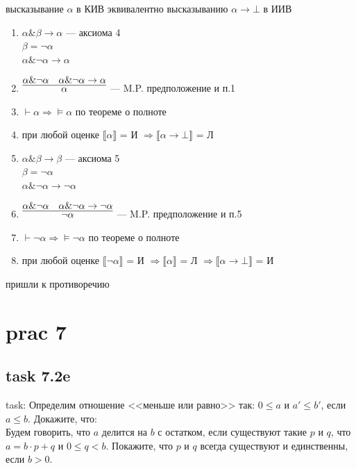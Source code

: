 \documentclass[12pt]{article}
\begin{document}
высказывание $\alpha$ в КИВ эквивалентно высказыванию $\alpha\rightarrow \bot$ в ИИВ

\begin{enumerate}
    \item $\alpha \& \beta \rightarrow \alpha$ --- аксиома 4\\
    $\beta = \neg\alpha$\\
    $\alpha \& \neg\alpha \rightarrow \alpha$
    \item $\infer{\alpha}{\alpha \& \neg\alpha\quad\alpha \& \neg\alpha \rightarrow \alpha}$ --- M.P. предположение и п.1
    \item $\vdash\alpha\Rightarrow\models\alpha$ по теореме о полноте
    \item при любой оценке $\llbracket \alpha \rrbracket$ = И $\Rightarrow \llbracket \alpha \rightarrow \bot \rrbracket$ = Л
    \item $\alpha \& \beta \rightarrow \beta$ --- аксиома 5\\
    $\beta = \neg\alpha$\\
    $\alpha \& \neg\alpha \rightarrow \neg\alpha$
    \item $\infer{\neg\alpha}{\alpha \& \neg\alpha\quad\alpha \& \neg\alpha \rightarrow \neg\alpha}$ --- M.P. предположение и п.5
    \item $\vdash\neg\alpha\Rightarrow\models\neg\alpha$ по теореме о полноте
    \item при любой оценке $\llbracket \neg\alpha \rrbracket$ = И $\Rightarrow \llbracket \alpha \rrbracket$ = Л $\Rightarrow  \llbracket \alpha \rightarrow \bot \rrbracket$ = И
    
\end{enumerate}

пришли к противоречию

\section*{prac 7}

\subsection*{task 7.2e}

task: Определим отношение <<меньше или равно>> так: $0 \le a$ и $a' \le b'$, если $a \le b$. Докажите, что:\\
Будем говорить, что $a$ делится на $b$ с остатком, если существуют такие $p$ и $q$, что 
$a = b \cdot p + q$ и $0 \le q < b$. Покажите, что $p$ и $q$ всегда существуют и единственны,
если $b > 0$.\\
\end{document}
